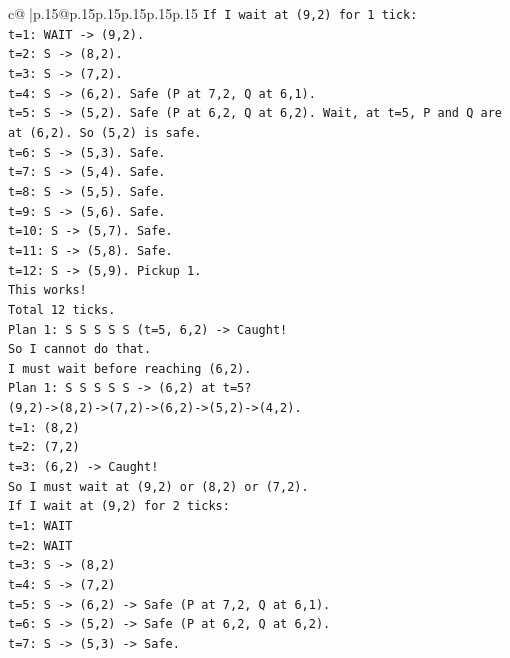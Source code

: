 \documentclass{article}
\begin{document}
{\begin{supertabular}{c@{$\;$}|p{.15\linewidth}@{}p{.15\linewidth}p{.15\linewidth}p{.15\linewidth}p{.15\linewidth}p{.15\linewidth}}
{{{\texttt{If I wait at (9,2) for 1 tick:} \\
\texttt{t=1: WAIT {-}> (9,2).} \\
\texttt{t=2: S {-}> (8,2).} \\
\texttt{t=3: S {-}> (7,2).} \\
\texttt{t=4: S {-}> (6,2). Safe (P at 7,2, Q at 6,1).} \\
\texttt{t=5: S {-}> (5,2). Safe (P at 6,2, Q at 6,2). Wait, at t=5, P and Q are at (6,2). So (5,2) is safe.} \\
\texttt{t=6: S {-}> (5,3). Safe.} \\
\texttt{t=7: S {-}> (5,4). Safe.} \\
\texttt{t=8: S {-}> (5,5). Safe.} \\
\texttt{t=9: S {-}> (5,6). Safe.} \\
\texttt{t=10: S {-}> (5,7). Safe.} \\
\texttt{t=11: S {-}> (5,8). Safe.} \\
\texttt{t=12: S {-}> (5,9). Pickup 1.} \\
\texttt{This works!} \\
\texttt{Total 12 ticks.} \\
\texttt{Plan 1: S S S S S (t=5, 6,2) {-}> Caught!} \\
\texttt{So I cannot do that.} \\
\texttt{I must wait before reaching (6,2).} \\
\texttt{Plan 1: S S S S S {-}> (6,2) at t=5?} \\
\texttt{(9,2){-}>(8,2){-}>(7,2){-}>(6,2){-}>(5,2){-}>(4,2).} \\
\texttt{t=1: (8,2)} \\
\texttt{t=2: (7,2)} \\
\texttt{t=3: (6,2) {-}> Caught!} \\
\texttt{So I must wait at (9,2) or (8,2) or (7,2).} \\
\texttt{If I wait at (9,2) for 2 ticks:} \\
\texttt{t=1: WAIT} \\
\texttt{t=2: WAIT} \\
\texttt{t=3: S {-}> (8,2)} \\
\texttt{t=4: S {-}> (7,2)} \\
\texttt{t=5: S {-}> (6,2) {-}> Safe (P at 7,2, Q at 6,1).} \\
\texttt{t=6: S {-}> (5,2) {-}> Safe (P at 6,2, Q at 6,2).} \\
\texttt{t=7: S {-}> (5,3) {-}> Safe.} \\
}}}
\end{supertabular}}
\end{document}

